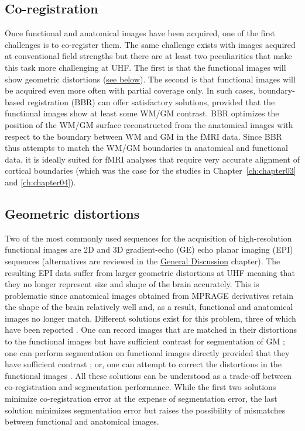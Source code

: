 \subsection{Co-registration}
Once functional and anatomical images have been acquired, one of the first challenges is to co-register them. The same challenge exists with images acquired at conventional field strengths but there are at least two peculiarities that make this task more challenging at UHF. The first is that the functional images will show geometric distortions (\hyperref[sec:distortions]{see below}). The second is that functional images will be acquired even more often with partial coverage only. In such cases, boundary-based registration (BBR) \parencite{Greve2009} can offer satisfactory solutions, provided that the functional images show at least some WM/GM contrast. BBR optimizes the position of the WM/GM surface reconstructed from the anatomical images with respect to the boundary between WM and GM in the fMRI data. Since BBR thus attempts to match the WM/GM boundaries in anatomical and functional data, it is ideally suited for fMRI analyses that require very accurate alignment of cortical boundaries \parencite{Polimeni2017} (which was the case for the studies in Chapter~\ref{ch:chapter03} and \ref{ch:chapter04}).

\subsection{Geometric distortions}
\label{sec:distortions}
Two of the most commonly used sequences for the acquisition of high-resolution functional images are 2D \parencite{Feinberg2010, Moeller2010, Setsompop2012} and 3D \parencite{Poser2010} gradient-echo (GE) echo planar imaging (EPI) sequences (alternatives are reviewed in the \hyperref[ch:chapter05]{General Discussion} chapter). The resulting EPI data suffer from larger geometric distortions at UHF meaning that they no longer represent size and shape of the brain accurately. This is problematic since anatomical images obtained from MPRAGE derivatives retain the shape of the brain relatively well and, as a result, functional and anatomical images no longer match. Different solutions exist for this problem, three of which have been reported \parencite{DeMartino2016}. One can record images that are matched in their distortions to the functional images but have sufficient contrast for segmentation of GM \parencite{Renvall2016, Kashyap2017}; one can perform segmentation on functional images directly provided that they have sufficient contrast \parencite{Fracasso2016}; or, one can attempt to correct the distortions in the functional images \parencite{Emmerling2016, Marquardt2018}. All these solutions can be understood as a trade-off between co-registration and segmentation performance. While the first two solutions minimize co-registration error at the expense of segmentation error, the last solution minimizes segmentation error but raises the possibility of mismatches between functional and anatomical images.


